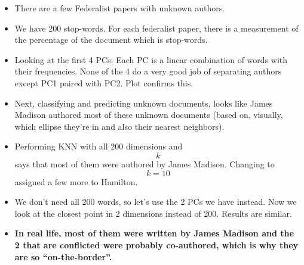 \begin{itemize}
\tightlist
\item
  There are a few Federalist papers with unknown authors.
\item
  We have 200 stop-words. For each federalist paper, there is a
  measurement of the percentage of the document which is stop-words.
\item
  Looking at the first 4 PCs: Each PC is a linear combination of words
  with their frequencies. None of the 4 do a very good job of separating
  authors except PC1 paired with PC2. Plot confirms this.
\item
  Next, classifying and predicting unknown documents, looks like James
  Madison authored most of these unknown documents (based on, visually,
  which ellipse they're in and also their nearest neighbors).
\item
  Performing KNN with all 200 dimensions and \[k\] says that most of
  them were authored by James Madison. Changing to \[k = 10\] assigned a
  few more to Hamilton.
\item
  We don't need all 200 words, so let's use the 2 PCs we have instead.
  Now we look at the closest point in 2 dimensions instead of 200.
  Results are similar.
\item
  \textbf{In real life, most of them were written by James Madison and
  the 2 that are conflicted were probably co-authored, which is why they
  are so ``on-the-border''.}
\end{itemize}
